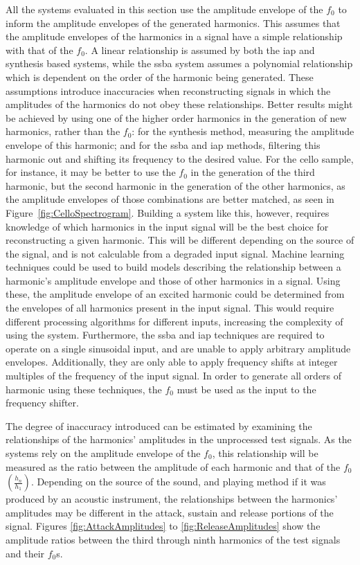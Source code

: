 		All the systems evaluated in this section use the amplitude envelope of the $f_{0}$ to inform the amplitude
		envelopes of the generated harmonics. This assumes that the amplitude envelopes of the harmonics in a
		signal have a simple relationship with that of the $f_{0}$. A linear relationship is assumed by both the
		\acrshort{iap} and synthesis based systems, while the \acrshort{ssba} system assumes a polynomial
		relationship which is dependent on the order of the harmonic being generated. These assumptions introduce
		inaccuracies when reconstructing signals in which the amplitudes of the harmonics do not obey these
		relationships. Better results might be achieved by using one of the higher order harmonics in the
		generation of new harmonics, rather than the $f_{0}$: for the synthesis method, measuring the amplitude
		envelope of this harmonic; and for the \acrshort{ssba} and \acrshort{iap} methods, filtering this harmonic
		out and shifting its frequency to the desired value. For the cello sample, for instance, it may be better
		to use the $f_{0}$ in the generation of the third harmonic, but the second harmonic in the generation of
		the other harmonics, as the amplitude envelopes of those combinations are better matched, as seen in
		Figure~\ref{fig:CelloSpectrogram}. Building a system like this, however, requires knowledge of which
		harmonics in the input signal will be the best choice for reconstructing a given harmonic. This will be
		different depending on the source of the signal, and is not calculable from a degraded input signal.
		Machine learning techniques could be used to build models describing the relationship between a harmonic's
		amplitude envelope and those of other harmonics in a signal. Using these, the amplitude envelope of an
		excited harmonic could be determined from the envelopes of all harmonics present in the input signal. This
		would require different processing algorithms for different inputs, increasing the complexity of using the
		system. Furthermore, the \acrshort{ssba} and \acrshort{iap} techniques are required to operate on a single
		sinusoidal input, and are unable to apply arbitrary amplitude envelopes. Additionally, they are only able
		to apply frequency shifts at integer multiples of the frequency of the input signal. In order to generate
		all orders of harmonic using these techniques, the $f_{0}$ must be used as the input to the frequency
		shifter.
		
		The degree of inaccuracy introduced can be estimated by examining the relationships of the harmonics'
		amplitudes in the unprocessed test signals. As the systems rely on the amplitude envelope of the $f_{0}$,
		this relationship will be measured as the ratio between the amplitude of each harmonic and that of the
		$f_{0}$ $\left(\frac{h_{n}}{h_{1}}\right)$. Depending on the source of the sound, and playing method if
		it was produced by an acoustic instrument, the relationships between the harmonics' amplitudes may be
		different in the attack, sustain and release portions of the signal. Figures \ref{fig:AttackAmplitudes} to
		\ref{fig:ReleaseAmplitudes} show the amplitude ratios between the third through ninth harmonics of the test
		signals and their $f_{0}$s.

